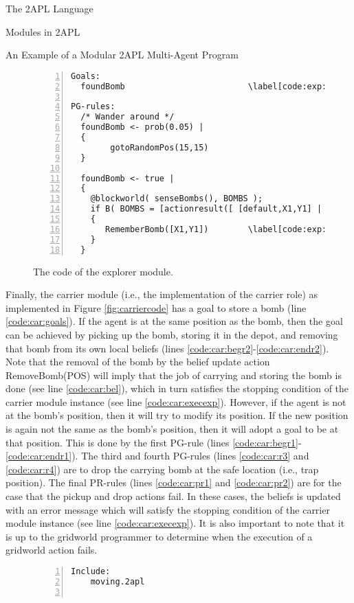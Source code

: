 \begin{chapter}{The 2APL Language}
\begin{section}{Modules in 2APL}
\begin{subsection}{An Example of a Modular 2APL Multi-Agent Program}
\begin{figure}[H]
\begin{Verbatim}[frame=single,numbers=left,firstnumber=last,
                 numbersep=2pt,commandchars=\\\[\]]
Goals:
  foundBomb                         \label[code:exp:goal]

PG-rules:
  /* Wander around */
  foundBomb <- prob(0.05) |
  {
        gotoRandomPos(15,15)
  }

  foundBomb <- true |
  {
    @blockworld( senseBombs(), BOMBS );
    if B( BOMBS = [actionresult([ [default,X1,Y1] | REST ])]) then
    {
       RememberBomb([X1,Y1])        \label[code:exp:pos]
    }
  }
\end{Verbatim}
\caption{The code of the explorer module.}\label{fig:explorercode}
\end{figure}

Finally, the carrier module (i.e., the implementation of the carrier
role) as implemented in Figure \ref{fig:carriercode} has a goal to
store a bomb (line \ref{code:car:goals}). If the agent is at the
same position as the bomb, then the goal can be achieved by picking
up the bomb, storing it in the depot, and removing that bomb from
its own local beliefs (lines
\ref{code:car:begr2}-\ref{code:car:endr2}). Note that the removal of
the bomb by the belief update action \ttt RemoveBomb(POS) \ttt will
imply that the job of carrying and storing the bomb is done (see
line \ref{code:car:bel}), which in turn satisfies the stopping
condition of the carrier module instance (see line
\ref{code:car:execexp}). However, if the agent is not at the bomb's
position, then it will try to modify its position. If the new
position is again not the same as the bomb's position, then it will
adopt a goal to be at that position. This is done by the first
PG-rule (lines \ref{code:car:begr1}-\ref{code:car:endr1}). The third
and fourth PG-rules (lines \ref{code:car:r3} and \ref{code:car:r4}) are to drop the carrying bomb at the safe
location (i.e., \ttt trap \ttt position). The final PR-rules (lines \ref{code:car:pr1} and \ref{code:car:pr2}) are for
the case that the pickup and drop actions fail. In these cases, the
beliefs is updated with an error message which will satisfy the
stopping condition of the carrier module instance (see line
\ref{code:car:execexp}). It is also important to note
that it is up to the gridworld programmer to determine when the
execution of a gridworld action fails.

\begin{figure}[H]
\begin{Verbatim}[frame=single,numbers=left,firstnumber=last,
                 numbersep=2pt,commandchars=\\\[\]]
Include:
    moving.2apl


\end{Verbatim}
\end{figure}
\end{subsection}
\end{section}
\end{chapter}
